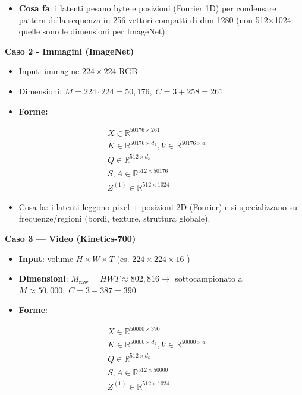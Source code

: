 \documentclass[
  11pt,
]{article}
\begin{document}
\begin{itemize}
\item
  \textbf{Cosa fa}: i latenti pesano byte e posizioni (Fourier 1D) per
  condensare pattern della sequenza in 256 vettori compatti di dim 1280 (non 512$\times$1024: quelle sono le dimensioni per ImageNet).
\end{itemize}

\textbf{Caso 2 - Immagini (ImageNet)}

\begin{itemize}
\item
  Input: immagine \(224 \times 224\) RGB
\item
  Dimensioni: \(M = 224 \cdot 224 = 50{,}176,\; C = 3 + 258 = 261\)
\item
  \textbf{Forme:}
\end{itemize}

\[\begin{matrix}
 & X \in \mathbb{R}^{50176 \times 261} \\
 & K \in \mathbb{R}^{50176 \times d_{k}},V \in \mathbb{R}^{50176 \times d_{v}} \\
 & Q \in \mathbb{R}^{512 \times d_{k}} \\
 & S,A \in \mathbb{R}^{512 \times 50176} \\
 & Z^{(1)} \in \mathbb{R}^{512 \times 1024}
\end{matrix}\]

\begin{itemize}
\item
  Cosa fa: i latenti leggono pixel + posizioni 2D (Fourier) e si
  specializzano su frequenze/regioni (bordi, texture, struttura
  globale).
\end{itemize}

\textbf{Caso 3 --- Video (Kinetics-700)}

\begin{itemize}
\item
  \textbf{Input}: volume \(H \times W \times T\) (es.
  \(224 \times 224 \times 16\) )
\item
  \textbf{Dimensioni}:
  \(M_{\text{raw}} = HWT \approx 802,816 \rightarrow\) sottocampionato
  a \(M \approx 50{,}000;\; C = 3 + 387 = 390\)
\item
  \textbf{Forme}:
\end{itemize}

\[\begin{matrix}
 & X \in \mathbb{R}^{50000 \times 390} \\
 & K \in \mathbb{R}^{50000 \times d_{k}},V \in \mathbb{R}^{50000 \times d_{v}} \\
 & Q \in \mathbb{R}^{512 \times d_{k}} \\
 & S,A \in \mathbb{R}^{512 \times 50000} \\
 & Z^{(1)} \in \mathbb{R}^{512 \times 1024}
\end{matrix}\]
\end{document}
